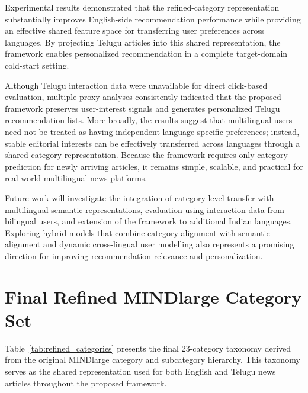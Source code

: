 \documentclass[conference]{IEEEtran}
\begin{document}
Experimental results demonstrated that the refined-category representation substantially improves English-side recommendation performance while providing an effective shared feature space for transferring user preferences across languages. By projecting Telugu articles into this shared representation, the framework enables personalized recommendation in a complete target-domain cold-start setting.

Although Telugu interaction data were unavailable for direct click-based evaluation, multiple proxy analyses consistently indicated that the proposed framework preserves user-interest signals and generates personalized Telugu recommendation lists. More broadly, the results suggest that multilingual users need not be treated as having independent language-specific preferences; instead, stable editorial interests can be effectively transferred across languages through a shared category representation. Because the framework requires only category prediction for newly arriving articles, it remains simple, scalable, and practical for real-world multilingual news platforms.

Future work will investigate the integration of category-level transfer with multilingual semantic representations, evaluation using interaction data from bilingual users, and extension of the framework to additional Indian languages. Exploring hybrid models that combine category alignment with semantic alignment and dynamic cross-lingual user modelling also represents a promising direction for improving recommendation relevance and personalization.





\appendices
\section{Final Refined MINDlarge Category Set}

Table~\ref{tab:refined_categories} presents the final 23-category taxonomy derived from the original MINDlarge category and subcategory hierarchy. This taxonomy serves as the shared representation used for both English and Telugu news articles throughout the proposed framework.

\begin{table}[ht]
\centering
\caption{Final refined MINDlarge category set}
\label{tab:refined_categories}
\end{table}
\end{document}
